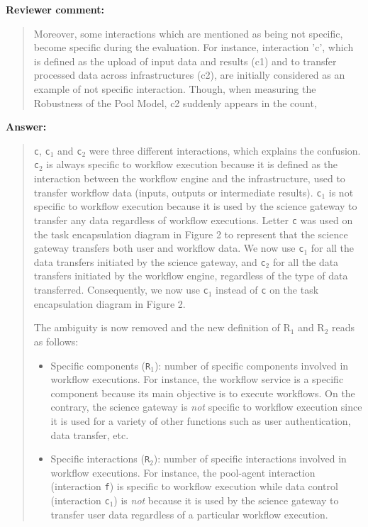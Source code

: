 \documentclass[a4]{article}
\newenvironment{review}%
{\textbf{Reviewer comment:}\begin{quote}}%
{\end{quote}}%
\newenvironment{answer}%
{\textbf{Answer:}\begin{small}\begin{quote}}%
{\end{quote}\end{small}}%
\newcommand{\revised}[1]{\color{blue} #1\color{black}\xspace}
\begin{document}
\begin{review}
Moreover, some
  interactions which are mentioned as being not specific, become
  specific during the evaluation. For instance, interaction 'c', which
  is defined as the upload of input data and results (c1) and to
  transfer processed data across infrastructures (c2), are initially
  considered as an example of not specific interaction. Though, when
  measuring the Robustness of the Pool Model, c2 suddenly appears in
  the count, 
\end{review}

\begin{answer}
\texttt{c}, \texttt{c$_1$} and \texttt{c$_2$} were three different
interactions, which explains the confusion. \texttt{c$_2$} is always
specific to workflow execution because it is defined as the
interaction between the workflow engine and the infrastructure, used
to transfer workflow data (inputs, outputs or intermediate
results). \texttt{c$_1$} is not specific to workflow execution because
it is used by the science gateway to transfer any data regardless of
workflow executions. Letter \texttt{c} was used on the task
encapsulation diagram in Figure 2 to represent that the science gateway transfers
both user and workflow data. We now use \texttt{c$_1$} for all the
data transfers initiated by the science gateway, and \texttt{c$_2$}
for all the data transfers initiated by the workflow engine,
regardless of the type of data transferred. Consequently, we now use
\texttt{c$_1$} instead of \texttt{c} on the task encapsulation diagram in Figure 2.

The ambiguity is now removed and the new definition of R$_1$ and R$_2$ reads as follows:

\begin{itemize}
\item Specific components (\texttt{R$_1$}): number of specific components involved in workflow executions. \revised{For instance, the
  workflow service is a specific component because its main objective
  is to execute workflows. On the contrary, the science gateway is
  \emph{not} specific to workflow execution since it is used for a
  variety of other functions such as user authentication, data
  transfer, etc.}
\item Specific interactions (\texttt{R$_2$}): number of specific
  interactions involved in workflow executions. \revised{For
    instance, the pool-agent interaction (interaction \texttt{f}) is
    specific to workflow execution while data control (interaction
    \texttt{c$_1$}) is \emph{not} because it is used by the science gateway to transfer
    user data regardless of a particular workflow execution}.
\end{itemize}
\end{answer}
\end{document}
